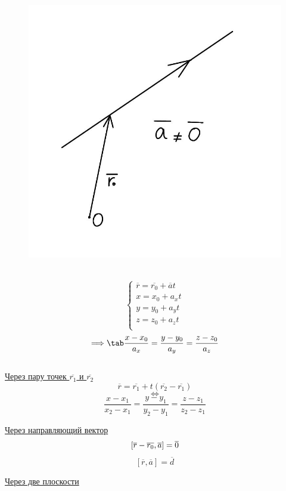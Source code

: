 \begin{figure}
    \includegraphics[width=0.84\linewidth]{images/3.1.jpeg}
\end{figure}

\tab\\

\[
\begin{cases}
    \overline{r} = \overline{r_0} + \overline{a}t\\
    x = x_0 + a_xt\\
    y = y_0 + a_yt\\
    z = z_0 + a_zt\\
\end{cases} 
\]
\[
\Longrightarrow \tab \dfrac{x - x_0}{a_x} = \dfrac{y - y_0}{a_y} = \dfrac{z - z_0}{a_z}
\]
\tab\\
\underline{Через пару точек $\overline{r_1}$ и $\overline{r_2}$}\\

\[
\overline{r} = \overline{r_1} + t(\overline{r_2} - \overline{r_1})
\]
\[
\Longleftrightarrow
\]
\[
\dfrac{x - x_1}{x_2 - x_1} = \dfrac{y - y_1}{y_2 - y_1} = \dfrac{z - z_1}{z_2 - z_1}
\]

\underline{Через направляющий вектор}\\

\[
[\overline{r} - \overline{r_0}, \overline{a}] = \overline{0}\\
\]
\[
[\overline{r}, \overline{a}] = \overline{d}
\]

\underline{Через две плоскости}\\

